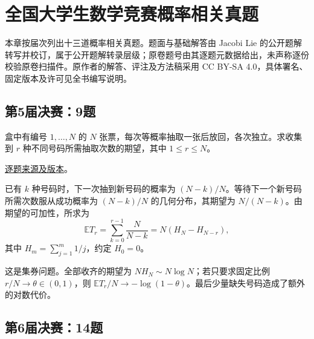 \setcounter{chapter}{0} %
\chapter{全国大学生数学竞赛概率相关真题}

本章按届次列出十三道概率相关真题。题面与基础解答由 Jacobi Lie 的公开题解转写并校订，属于公开题解转录层级；原卷题号由其逐题元数据给出，未声称逐份校验原卷扫描件。原作者的解答、评注及方法稿采用 CC BY-SA 4.0，具体署名、固定版本及许可见全书编写说明。

\section{第5届决赛：9题}\label{pr:fin05-hi:9}

\begin{example}[公开题解转录]\label{q:fin05-hi:9}

盒中有编号 $1,\ldots,N$ 的 $N$ 张票，每次等概率抽取一张后放回，各次独立。求收集到 $r$ 种不同号码所需抽取次数的期望，其中 $1\le r\le N$。

\end{example}

\href{https://github.com/lzxcr/cmc-mathematics/blob/64916fa1fdbc3e444a652eca204d5669058ee321/src/problems/finals/05/10.md}{逐题来源及版本}。

\begin{solve}

已有 $k$ 种号码时，下一次抽到新号码的概率为 $(N-k)/N$。等待下一个新号码所需次数服从成功概率为 $(N-k)/N$ 的几何分布，其期望为 $N/(N-k)$。由期望的可加性，所求为
\[
\mathbb E T_r=\sum_{k=0}^{r-1}\frac{N}{N-k}
=N(H_N-H_{N-r}),
\]
其中 $H_m=\sum_{j=1}^m1/j$，约定 $H_0=0$。

\end{solve}

\begin{remark}[方法与条件]

这是集券问题。全部收齐的期望为 $NH_N\sim N\log N$；若只要求固定比例 $r/N\to\theta\in(0,1)$，则 $\mathbb E T_r/N\to-\log(1-\theta)$。最后少量缺失号码造成了额外的对数代价。

\end{remark}

\section{第6届决赛：14题}\label{pr:fin06-hi:14}

